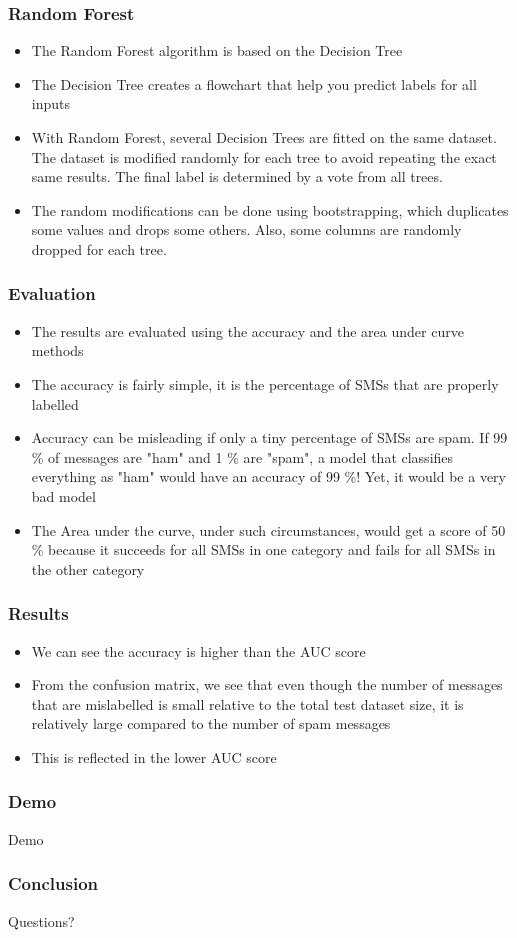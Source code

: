 \documentclass[]{beamer}
\begin{document}
\begin{frame}
  \frametitle{Random Forest}

  \begin{itemize}
  \item The Random Forest algorithm is based on the Decision Tree
  \item The Decision Tree creates a flowchart that help you predict labels for all inputs
  \item With Random Forest, several Decision Trees are fitted on the same dataset. The dataset is modified randomly for each tree to avoid repeating the exact same results. The final label is determined by a vote from all trees.
  \item The random modifications can be done using bootstrapping, which duplicates some values and drops some others. Also, some columns are randomly dropped for each tree.
  \end{itemize}
\end{frame}

\begin{frame}
  \frametitle{Evaluation}

  \begin{itemize}
  \item The results are evaluated using the accuracy and the area under curve methods
  \item The accuracy is fairly simple, it is the percentage of SMSs that are properly labelled
  \item Accuracy can be misleading if only a tiny percentage of SMSs are spam. If 99 \% of messages are "ham" and 1 \% are "spam", a model that classifies everything as "ham" would have an accuracy of 99 \%! Yet, it would be a very bad model
  \item The Area under the curve, under such circumstances, would get a score of 50 \% because it succeeds for all SMSs in one category and fails for all SMSs in the other category
  \end{itemize}
\end{frame}

\begin{frame}
  \frametitle{Results}

  \begin{itemize}
  \item We can see the accuracy is higher than the AUC score
  \item From the confusion matrix, we see that even though the number of messages that are mislabelled is small relative to the total test dataset size, it is relatively large compared to the number of spam messages
  \item This is reflected in the lower AUC score
  \end{itemize}
\end{frame}

\begin{frame}
  \frametitle{Demo}
  \begin{center}
  \Huge{Demo}
  \end{center}
\end{frame}

\begin{frame}
  \frametitle{Conclusion}
  \begin{center}
    \Huge{Questions?}
  \end{center}

\end{frame}
\end{document}
